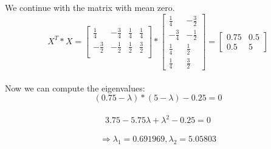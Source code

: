 \documentclass[12pt]{article}
\begin{document}
\begin{enumerate}[a)]
        We continue with the matrix with mean zero.\\
        $$X^T * X = \begin{bmatrix} \frac{1}{4} & -\frac{3}{4} & \frac{1}{4}  & \frac{1}{4}\\
        				-\frac{3}{2}& -\frac{1}{2} & \frac{1}{2} & \frac{3}{2} \\
        				\end{bmatrix} *
        				\begin{bmatrix} \frac{1}{4}& -\frac{3}{2} \\ -\frac{3}{4}&-\frac{1}{2} \\ \frac{1}{4} & \frac{1}{2} \\ \frac{1}{4} & \frac{3}{2} \end{bmatrix}
        				= \begin{bmatrix}
        					0.75 & 0.5 \\
        					0.5 & 5
        				\end{bmatrix}
        				$$\\
        	Now we can compute the eigenvalues:\\
        		$$ (0.75 - \lambda)*(5 - \lambda)-0.25 =0$$\\
        		$$ 3.75 - 5.75\lambda + \lambda^2 -0.25 = 0$$\\
        		$$ \Rightarrow \lambda_1= 0.691969, \lambda_2=5.05803 $$\\
        		

\end{enumerate}
\end{document}
